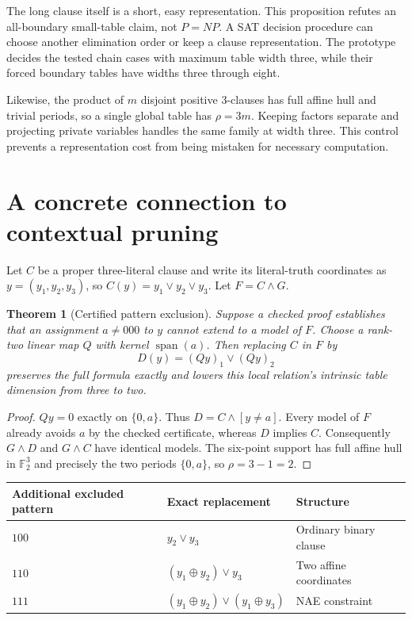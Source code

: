 \documentclass[11pt]{article}
\newtheorem{theorem}{Theorem}
\newcommand{\F}{\mathbb F_2}
\begin{document}
The long clause itself is a short, easy representation. This proposition refutes
an all-boundary small-table claim, not $P=NP$. A SAT decision procedure can choose
another elimination order or keep a clause representation. The prototype decides
the tested chain cases with maximum table width three, while their forced boundary
tables have widths three through eight.

Likewise, the product of $m$ disjoint positive 3-clauses has full affine hull and
trivial periods, so a single global table has $\rho=3m$. Keeping factors separate
and projecting private variables handles the same family at width three. This
control prevents a representation cost from being mistaken for necessary computation.

\section{A concrete connection to contextual pruning}
Let $C$ be a proper three-literal clause and write its literal-truth coordinates as
$y=(y_1,y_2,y_3)$, so $C(y)=y_1\lor y_2\lor y_3$. Let $F=C\land G$.

\begin{theorem}[Certified pattern exclusion]\label{thm:prune}
Suppose a checked proof establishes that an assignment $a\ne000$ to $y$ cannot
extend to a model of $F$. Choose a rank-two linear map $Q$ with kernel
$\operatorname{span}(a)$. Then replacing $C$ in $F$ by
\[
 D(y)=(Qy)_1\lor(Qy)_2
\]
preserves the full formula exactly and lowers this local relation's intrinsic
table dimension from three to two.
\end{theorem}
\begin{proof}
$Qy=0$ exactly on $\{0,a\}$. Thus $D=C\land[y\ne a]$. Every model of $F$ already
avoids $a$ by the checked certificate, whereas $D$ implies $C$. Consequently
$G\land D$ and $G\land C$ have identical models. The six-point support has full
affine hull in $\F^3$ and precisely the two periods $\{0,a\}$, so $\rho=3-1=2$.
\end{proof}

\begin{center}
\begin{tabular}{lll}
\toprule
Additional excluded pattern & Exact replacement & Structure\\
\midrule
$100$ & $y_2\lor y_3$ & Ordinary binary clause\\
$110$ & $(y_1\oplus y_2)\lor y_3$ & Two affine coordinates\\
$111$ & $(y_1\oplus y_2)\lor(y_1\oplus y_3)$ & NAE constraint\\
\bottomrule
\end{tabular}
\end{center}
\end{document}
